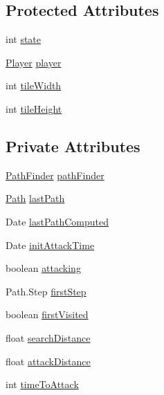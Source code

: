 \subsection*{Protected Attributes}
\begin{DoxyCompactItemize}
\item 
int \mbox{\hyperlink{classentities_1_1_a_i_handler_basic_afe4e5d49bf8c83164a89b0dec990406f}{state}}
\item 
\mbox{\hyperlink{classentities_1_1_player}{Player}} \mbox{\hyperlink{classentities_1_1_a_i_handler_basic_ad7c5aba342053f29862df5f38537bf1c}{player}}
\item 
int \mbox{\hyperlink{classentities_1_1_a_i_handler_basic_a177ec0f84d2ce15ba89575b5a87cc742}{tile\+Width}}
\item 
int \mbox{\hyperlink{classentities_1_1_a_i_handler_basic_a9e9f42b3f5f874a95d171885e89c663c}{tile\+Height}}
\end{DoxyCompactItemize}
\subsection*{Private Attributes}
\begin{DoxyCompactItemize}
\item 
\mbox{\hyperlink{classentities_1_1_path_finder}{Path\+Finder}} \mbox{\hyperlink{classentities_1_1_a_i_handler_basic_a285a9398062da6b974dc7a2d8e7e630d}{path\+Finder}}
\item 
\mbox{\hyperlink{classorg_1_1newdawn_1_1slick_1_1util_1_1pathfinding_1_1_path}{Path}} \mbox{\hyperlink{classentities_1_1_a_i_handler_basic_a602787aae6ac3b507885afeece3f7b3f}{last\+Path}}
\item 
Date \mbox{\hyperlink{classentities_1_1_a_i_handler_basic_ac37a209c05f1e2848e0179de643e6c45}{last\+Path\+Computed}}
\item 
Date \mbox{\hyperlink{classentities_1_1_a_i_handler_basic_ac5e99310b688afd1fd14a9087946cf84}{init\+Attack\+Time}}
\item 
boolean \mbox{\hyperlink{classentities_1_1_a_i_handler_basic_a638da72d035b8f01b2639453d50589a2}{attacking}}
\item 
Path.\+Step \mbox{\hyperlink{classentities_1_1_a_i_handler_basic_a33774addab53a181bb96d147186d3b2c}{first\+Step}}
\item 
boolean \mbox{\hyperlink{classentities_1_1_a_i_handler_basic_a2b833b13b6d0e6bf8014f077e8b07dda}{first\+Visited}}
\item 
float \mbox{\hyperlink{classentities_1_1_a_i_handler_basic_acb64b3c7941a4f72fd76262280b3e399}{search\+Distance}}
\item 
float \mbox{\hyperlink{classentities_1_1_a_i_handler_basic_a3901dfebb437d4f21a074af70d00c940}{attack\+Distance}}
\item 
int \mbox{\hyperlink{classentities_1_1_a_i_handler_basic_ae730320459166e3816b22b30b5d68459}{time\+To\+Attack}}
\end{DoxyCompactItemize}
